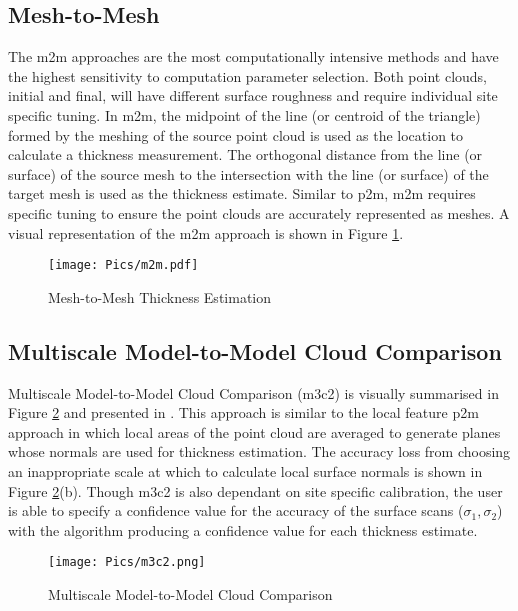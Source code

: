 \subsection{Mesh-to-Mesh}
The \acrshort{m2m} approaches are the most computationally intensive methods and have the highest sensitivity to computation parameter selection. Both point clouds, initial and final, will have different surface roughness and require individual site specific tuning. In \acrshort{m2m}, the midpoint of the line (or centroid of the triangle) formed by the meshing of the source point cloud is used as the location to calculate a thickness measurement. The orthogonal distance from the line (or surface) of the source mesh to the intersection with the line (or surface) of the target mesh is used as the thickness estimate. Similar to \acrshort{p2m}, \acrshort{m2m} requires specific tuning to ensure the point clouds are accurately represented as meshes. A visual representation of the \acrshort{m2m} approach is shown in Figure \ref{fig:m2mdia}.\\
\begin{figure}[h!]
    \centering
    \texttt{[image: Pics/m2m.pdf]}
    \caption{Mesh-to-Mesh Thickness Estimation}
    \label{fig:m2mdia}
\end{figure}
\clearpage
\subsection{Multiscale Model-to-Model Cloud Comparison}

Multiscale Model-to-Model Cloud Comparison (\acrshort{m3c2}) is visually summarised in Figure \ref{fig:m3c2} and presented in \cite{thick2}. This approach is similar to the local feature \acrshort{p2m} approach in which local areas of the point cloud are averaged to generate planes whose normals are used for thickness estimation. The accuracy loss from choosing an inappropriate scale at which to calculate local surface normals is shown in Figure \ref{fig:m3c2}(b). Though \acrshort{m3c2} is also dependant on site specific calibration, the user is able to specify a confidence value for the accuracy of the surface scans ($\sigma_1,\sigma_2$) with the algorithm producing a confidence value for each thickness estimate.\\

\begin{figure}[h!]
    \centering
    \texttt{[image: Pics/m3c2.png]}
    \caption{Multiscale Model-to-Model Cloud Comparison \cite{thick1}}
    \label{fig:m3c2}
\end{figure}

